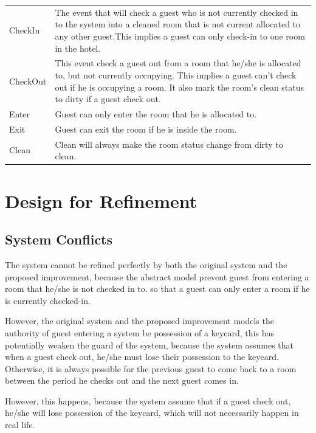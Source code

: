 \documentclass[a4paper]{article}
\begin{document}
\begin{center}

\begin{tabular}{|p{2.5cm}|p{8cm}|}
\hline
\color{blue}{Event} & \color{blue}{Function}\\
\hline
CheckIn & The event that will check a guest who is not currently checked in to the system into a cleaned room that is not current allocated to any other guest.\linebreak This implies a guest can only check-in to one room in the hotel. \\
\hline
CheckOut & This event check a guest out from a room that he/she is allocated to, but not currently occupying. This implies a guest can't check out if he is occupying a room. It also mark the room's clean status to dirty if a guest check out.\\
\hline
Enter & Guest can only enter the room that he is allocated to.\\
\hline
Exit & Guest can exit the room if he is inside the room.\\
\hline
Clean & Clean will always make the room status change from dirty to clean.\\
\hline
\end{tabular}
\end{center}
\section{Design for Refinement}

\subsection{System Conflicts}
\indent The system cannot be refined perfectly by both the original system and the proposed improvement, because the abstract model prevent guest from entering a room that he/she is not checked in to. so that a guest can only enter a room if he is currently checked-in.

However, the original system and the proposed improvement models the authority of guest entering a system be possession of a keycard, this has potentially weaken the guard of the system, because the system assumes that when a guest check out, he/she must lose their possession to the keycard. Otherwise, it is always possible for the previous guest to come back to a room between the period he checks out and the next guest comes in.

However, this happens, because the system assume that if a guest check out, he/she will lose possession of the keycard, which will not necessarily happen in real life.
\end{document}
